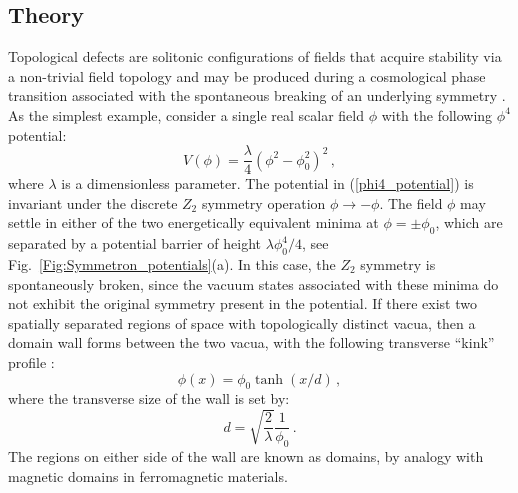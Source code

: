 \documentclass[aps,prd,onecolumn,nofootinbib]{revtex4-2} %
\begin{document}
\subsection{Theory}
\label{Sec:Main_Theory}
Topological defects are solitonic configurations of fields that acquire stability via a non-trivial field topology and may be produced during a cosmological phase transition associated with the spontaneous breaking of an underlying symmetry \cite{Vilenkin_1985_TDs}. 
As the simplest example, consider a single real scalar field $\phi$ with the following $\phi^4$ potential:
\begin{equation}
\label{phi4_potential}
V ( \phi ) = \frac{\lambda}{4} \left( \phi^2 - \phi_0^2 \right)^2  \, , 
\end{equation}
where $\lambda$ is a dimensionless parameter. 
The potential in (\ref{phi4_potential}) is invariant under the discrete $Z_2$ symmetry operation $\phi \to -\phi$. 
The field $\phi$ may settle in either of the two energetically equivalent minima at $\phi = \pm \phi_0$, which are separated by a potential barrier of height $\lambda \phi_0^4 / 4$, see Fig.~\ref{Fig:Symmetron_potentials}(a). 
In this case, the $Z_2$ symmetry is spontaneously broken, since the vacuum states associated with these minima do not exhibit the original symmetry present in the potential. 
If there exist two spatially separated regions of space with topologically distinct vacua, then a domain wall forms between the two vacua, with the following transverse ``kink'' profile \cite{Zeldovich-Okun_1974-DWs}: 
\begin{equation}
\label{wall_kink_solution}
\phi \left( x \right) = \phi_0 \tanh \left( x / d \right)  \, , 
\end{equation}
where the transverse size of the wall is set by: 
\begin{equation}
\label{wall_kink_thickness}
d = \sqrt{\frac{2}{\lambda}} \frac{1}{\phi_0}  \, . 
\end{equation}
The regions on either side of the wall are known as domains, by analogy with magnetic domains in ferromagnetic materials. 
\end{document}
